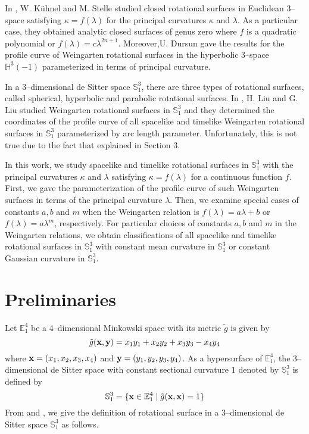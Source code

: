 \documentclass{amsart}
\theoremstyle{definition}
\numberwithin{equation}{section}
\begin{document}
In \cite{KS}, W. Kühnel and M. Stelle studied closed rotational surfaces in Euclidean 3--space satisfying $\kappa=f(\lambda)$ for the principal curvatures $\kappa$ and $\lambda$. 
As a particular case, they obtained analytic closed surfaces of genus zero where $f$ is a quadratic polynomial or $f(\lambda)=c\lambda^{2n+1}$.
Moreover,U. Dursun \cite{UD} gave the results for the profile curve of Weingarten rotational surfaces in the hyperbolic 3--space $\mathbb{H}^3(-1)$ parameterized in terms of principal curvature. 

In a 3--dimensional de Sitter space $\mathbb{S}^3_1$, 
there are three types of rotational surfaces, called spherical, hyperbolic and parabolic rotational surfaces.
In \cite{LL}, H. Liu and G. Liu studied Weingarten rotational surfaces in $\mathbb{S}^3_1$ and 
they determined the coordinates of the profile curve of all spacelike and timelike Weingarten rotational surfaces in $\mathbb{S}^3_1$ parameterized by arc length parameter. 
Unfortunately, this is not true due to the fact that explained in Section 3. 

In this work, we study spacelike and timelike rotational surfaces in $\mathbb{S}^3_1$ with the principal curvatures 
$\kappa$ and $\lambda$ satisfying $\kappa=f(\lambda)$ for a continuous function $f$. First, we gave the parameterization
of the profile curve of such Weingarten surfaces in terms of the principal curvature $\lambda$. Then, we examine special cases of constants $a,b$ and $m$ 
when the Weingarten relation is $f(\lambda)=a\lambda+b$ or $f(\lambda)=a\lambda^m$, respectively. 
For particular choices of constants $a,b$ and $m$ in the Weingarten relations, we obtain classifications of all spacelike and timelike rotational surfaces in $\mathbb{S}^3_1$ 
with constant mean curvature in $\mathbb{S}^3_1$
or constant Gaussian curvature in $\mathbb{S}^3_1$.

\section{Preliminaries}
Let $\mathbb{E}^4_1$ be a 4--dimensional Minkowski space with its metric $\tilde{g}$ is given by 
\begin{equation}
    \tilde{g}({\bf x}, {\bf y})=x_1y_1+x_2y_2+x_3y_3-x_4y_4
\end{equation}
where ${\bf x}=(x_1,x_2,x_3,x_4)$ and 
${\bf y}=(y_1,y_2,y_3,y_4)$.
As a hypersurface of $\mathbb{E}^4_1$, 
the 3--dimensional de Sitter space with constant sectional curvature $1$ denoted by $\mathbb{S}^3_1$ 
is defined by
\begin{equation}
    \mathbb{S}^3_1=\{{\bf x}\in{\mathbb{E}^4_1}\;|\;
    \tilde{g}({\bf x},{\bf x})=1\}
\end{equation}
From \cite{LL} and \cite{Carmo},  
we give the definition of rotational surface in a 3--dimensional de Sitter space $\mathbb{S}^3_1$ as follows.
\end{document}
